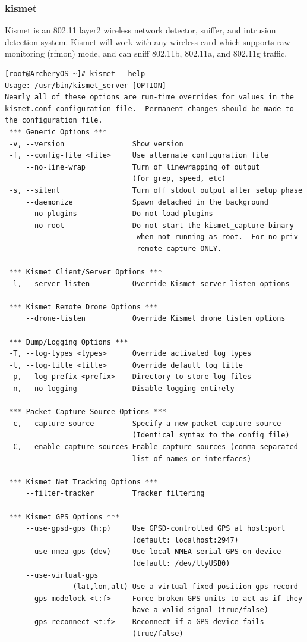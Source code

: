 \documentclass{article}
\begin{document}
\subsubsection{kismet}
Kismet is an 802.11 layer2 wireless network detector, sniffer, and intrusion detection system.  Kismet will work with any wireless card which supports raw monitoring (rfmon) mode, and can sniff 802.11b, 802.11a, and 802.11g traffic.
\begin{lstlisting}
[root@ArcheryOS ~]# kismet --help
Usage: /usr/bin/kismet_server [OPTION]
Nearly all of these options are run-time overrides for values in the
kismet.conf configuration file.  Permanent changes should be made to
the configuration file.
 *** Generic Options ***
 -v, --version                Show version
 -f, --config-file <file>     Use alternate configuration file
     --no-line-wrap           Turn of linewrapping of output
                              (for grep, speed, etc)
 -s, --silent                 Turn off stdout output after setup phase
     --daemonize              Spawn detached in the background
     --no-plugins             Do not load plugins
     --no-root				  Do not start the kismet_capture binary 
                               when not running as root.  For no-priv 
                               remote capture ONLY.

 *** Kismet Client/Server Options ***
 -l, --server-listen          Override Kismet server listen options

 *** Kismet Remote Drone Options ***
     --drone-listen           Override Kismet drone listen options

 *** Dump/Logging Options ***
 -T, --log-types <types>      Override activated log types
 -t, --log-title <title>      Override default log title
 -p, --log-prefix <prefix>    Directory to store log files
 -n, --no-logging             Disable logging entirely

 *** Packet Capture Source Options ***
 -c, --capture-source         Specify a new packet capture source
                              (Identical syntax to the config file)
 -C, --enable-capture-sources Enable capture sources (comma-separated
                              list of names or interfaces)

 *** Kismet Net Tracking Options ***
     --filter-tracker         Tracker filtering

 *** Kismet GPS Options ***
     --use-gpsd-gps (h:p)     Use GPSD-controlled GPS at host:port
                              (default: localhost:2947)
     --use-nmea-gps (dev)     Use local NMEA serial GPS on device
                              (default: /dev/ttyUSB0)
     --use-virtual-gps
                (lat,lon,alt) Use a virtual fixed-position gps record
     --gps-modelock <t:f>     Force broken GPS units to act as if they
                              have a valid signal (true/false)
     --gps-reconnect <t:f>    Reconnect if a GPS device fails
                              (true/false)
\end{lstlisting}
\end{document}
